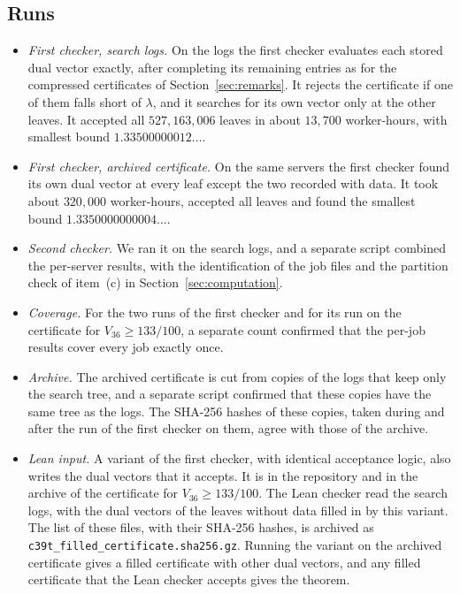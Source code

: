 \documentclass[11pt]{amsart}
\theoremstyle{definition}
\theoremstyle{remark}
\numberwithin{equation}{section}
\newcommand{\Nleaves}{527{,}163{,}006}
\newcommand{\MinLeaf}{1.3350000000004\ldots}
\begin{document}
\subsection*{Runs}
\begin{itemize}
\item \emph{First checker, search logs.} On the logs the first checker evaluates each stored dual vector exactly, after completing its remaining entries as for the compressed certificates of Section~\ref{sec:remarks}. It rejects the certificate if one of them falls short of $\lambda$, and it searches for its own vector only at the other leaves. It accepted all $\Nleaves$ leaves in about $13{,}700$ worker-hours, with smallest bound $1.33500000012\ldots$.
\item \emph{First checker, archived certificate.} On the same servers the first checker found its own dual vector at every leaf except the two recorded with data. It took about $320{,}000$ worker-hours, accepted all leaves and found the smallest bound $\MinLeaf$.
\item \emph{Second checker.} We ran it on the search logs, and a separate script combined the per-server results, with the identification of the job files and the partition check of item~(c) in Section~\ref{sec:computation}.
\item \emph{Coverage.} For the two runs of the first checker and for its run on the certificate for $V_{36}\ge133/100$, a separate count confirmed that the per-job results cover every job exactly once.
\item \emph{Archive.} The archived certificate is cut from copies of the logs that keep only the search tree, and a separate script confirmed that these copies have the same tree as the logs. The SHA-256 hashes of these copies, taken during and after the run of the first checker on them, agree with those of the archive.
\item \emph{Lean input.} A variant of the first checker, with identical acceptance logic, also writes the dual vectors that it accepts. It is in the repository and in the archive of the certificate for $V_{36}\ge133/100$. The Lean checker read the search logs, with the dual vectors of the leaves without data filled in by this variant. The list of these files, with their SHA-256 hashes, is archived as \texttt{c39t\_filled\_certificate.sha256.gz}. Running the variant on the archived certificate gives a filled certificate with other dual vectors, and any filled certificate that the Lean checker accepts gives the theorem.

\end{itemize}
\end{document}
